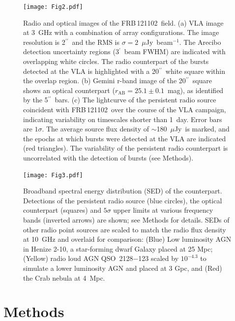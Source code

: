 \documentclass{nature_frb}
\newcommand{\frb}{FRB\,121102}
\newcommand{\uJy}{$\mu$Jy}
\newcommand{\arcsec}{\ensuremath{^{\prime\prime}}}
\newcommand{\arcmin}{\ensuremath{^{\prime}}}
\begin{document}
\begin{figure}
\begin{center}
\texttt{[image: Fig2.pdf]}
\end{center}
\caption{Radio and optical images of the \frb\ field.
(a) VLA image at 3~GHz with a combination of array configurations. The image resolution is 2\arcsec\ and the RMS is $\sigma = 2$~\uJy~beam$^{-1}$. The Arecibo detection\cite{ssh+16a} uncertainty regions (3\arcmin\ beam FWHM) are indicated with overlapping white circles. The radio counterpart of the bursts detected at the VLA is highlighted with a 20\arcsec\ white square within the overlap region. (b) Gemini r-band image of the 20\arcsec\ square shows an optical counterpart
($r_\mathrm{AB}=25.1\pm0.1$~mag), as identified by the 5\arcsec\ bars.
(c) The lightcurve of the persistent radio source coincident with \frb\ over the course of the VLA campaign, indicating variability on timescales shorter than 1~day. Error bars are $1\sigma$. The average source flux density of $\sim$180~\uJy\ is marked, and the epochs at which bursts were detected at the VLA are indicated (red triangles). The variability of the persistent radio counterpart is uncorrelated with the detection of bursts (see Methods).}
\label{fig:field}
\end{figure}

\clearpage


\begin{figure}
\begin{center}
\texttt{[image: Fig3.pdf]}
\end{center}
\caption{Broadband spectral energy distribution (SED) of the counterpart.
Detections of the persistent radio source (blue circles), the optical counterpart (squares) and $5\sigma$ upper limits at various frequency bands (inverted arrows) are shown; see Methods for details.
SEDs of other radio point sources are scaled to match the radio flux density at 10~GHz and overlaid for comparison: (Blue) Low luminosity AGN in Henize 2-10, a star-forming dwarf Galaxy\cite{rd2012} placed at 25 Mpc; (Yellow) radio loud AGN QSO~2128$-$123\cite{ewm+1994} scaled by $10^{-4.3}$ to simulate a lower luminosity AGN and placed at 3 Gpc, and (Red) the Crab nebula\cite{bb2014} at 4~Mpc.
\label{fig:sed}}
\end{figure}

\clearpage





\clearpage
\section*{Methods}
\end{document}

